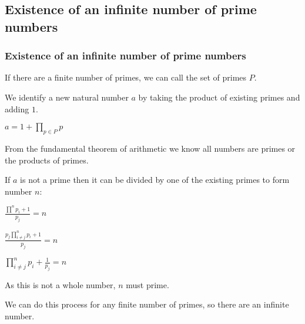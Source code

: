 
\subsection{Existence of an infinite number of prime numbers}

\subsubsection{Existence of an infinite number of prime numbers}

If there are a finite number of primes, we can call the set of primes \(P\).

We identify a new natural number \(a\) by taking the product of existing primes and adding \(1\).

$a=1+\prod_{p\in P} p$

From the fundamental theorem of arithmetic we know all numbers are primes or the products of primes.

If \(a\) is not a prime then it can be divided by one of the existing primes to form number \(n\):

$\frac{\prod^n p_i +1}{p_j}=n$

$\frac{p_j \prod^n_{i\ne j} p_i +1}{p_j}=n$

$\prod^n_{i\ne j} p_i +\frac{1}{p_j}=n$

As this is not a whole number, \(n\) must prime.

We can do this process for any finite number of primes, so there are an infinite number.

